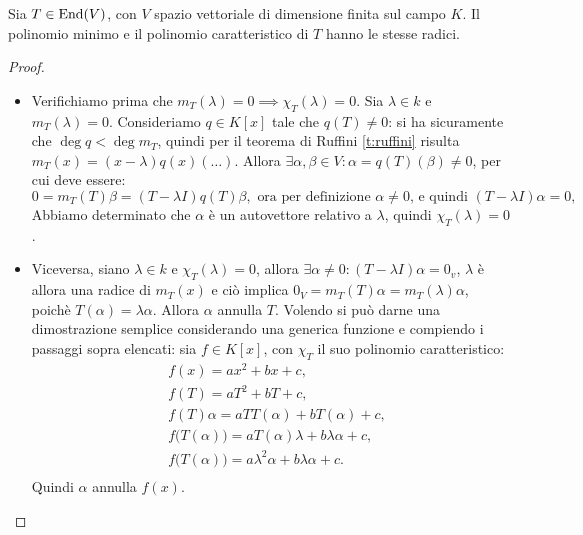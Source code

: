 \begin{teorema} \label{t:radici-polinomio-minimo-caratteristico}
	Sia $T\in \operatorname{End}(V)$, con $V$ spazio vettoriale di dimensione finita sul campo $K$.
	Il polinomio minimo e il polinomio caratteristico di $T$ hanno le stesse radici.
\end{teorema}
\begin{proof}
	\begin{itemize}
		\item Verifichiamo prima che $m_T(\lambda)= 0 \implies \chi_T(\lambda) = 0$.
			Sia $\lambda\in k$ e $m_T(\lambda)= 0$.
			Consideriamo $q\in K[x]$ tale che $q(T)\neq 0$: si ha sicuramente che $\deg q< \deg m_T$, quindi per il teorema di Ruffini \ref{t:ruffini} risulta $m_T(x) = (x-\lambda)q(x)(\dots)$.
			Allora $\exists \alpha,\beta\in V\colon \alpha = q(T) (\beta)\neq 0$, per cui deve essere:
			\begin{equation*}
				0 = m_T(T)\beta = (T-\lambda I)q(T)\beta, \text{ ora per definizione $\alpha\neq 0$, e quindi } (T-\lambda I) \alpha = 0,
			\end{equation*}
			Abbiamo determinato che $\alpha$ è un autovettore relativo a $\lambda$, quindi $\chi_T(\lambda) = 0$.
		\item Viceversa, siano $\lambda\in k$ e $\chi_T(\lambda) = 0$, allora $\exists \alpha\neq 0\colon (T-\lambda I)\alpha = 0_v$, $\lambda$ è allora una radice di $m_T(x)$ e ciò implica $0_V = m_T(T)\alpha = m_T(\lambda)\alpha$, poichè $T(\alpha) = \lambda \alpha$.
			Allora $\alpha$ annulla $T$. %
			Volendo si può darne una dimostrazione semplice considerando una generica funzione e compiendo i passaggi sopra elencati: sia $f\in K[x]$, con $\chi_T$ il suo polinomio caratteristico:
			\begin{equation*}
				\begin{aligned}
					&f(x) = a x^2 + b x + c,\\
					&f(T) = a T^2 + b T + c,\\
					&f(T)\alpha = a T T(\alpha) + b T(\alpha) + c,\\
					&f\big(T(\alpha)\big) = a T(\alpha) \lambda + b \lambda \alpha + c,\\
					&f\big(T(\alpha)\big) =  a \lambda^2 \alpha + b \lambda \alpha + c.\\
				\end{aligned}
			\end{equation*}
			Quindi $\alpha$ annulla $f(x)$.
	\end{itemize}
\end{proof} 

